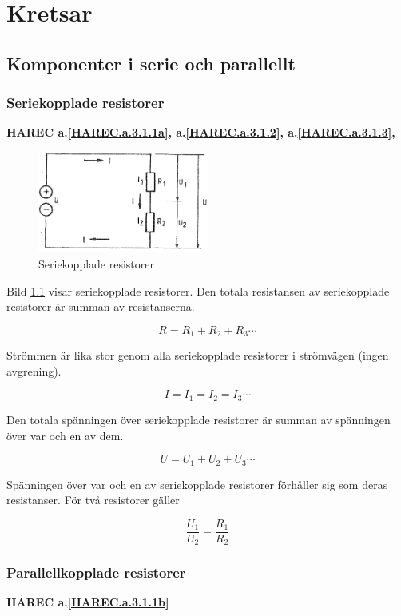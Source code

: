 \chapter{Kretsar}

\section[Serie och parallellt]{Komponenter i serie och parallellt}

\subsection{Seriekopplade resistorer}
\textbf{HAREC
  a.\ref{HAREC.a.3.1.1a}\label{myHAREC.a.3.1.1a},
  a.\ref{HAREC.a.3.1.2}\label{myHAREC.a.3.1.2a},
  a.\ref{HAREC.a.3.1.3}\label{myHAREC.a.3.1.3a},
}

\begin{figure}
\includegraphics[width=0.5\textwidth]{images/cropped_pdfs/bild_2_3-01.pdf}
\caption{Seriekopplade resistorer}
\label{fig:BildII3-01}
\end{figure}

Bild \ref{fig:BildII3-01} visar seriekopplade resistorer.
Den totala resistansen av seriekopplade resistorer är summan av resistanserna.

\[R = R_1 + R_2 + R_3 \cdots \]

Strömmen är lika stor genom alla seriekopplade resistorer i strömvägen (ingen
avgrening).

\[I = I_1 = I_2 = I_3 \cdots \]

Den totala spänningen över seriekopplade resistorer är summan av spänningen över
var och en av dem.

\[U = U_1 + U_2 + U_3 \cdots \]

Spänningen över var och en av seriekopplade resistorer förhåller sig som deras
resistanser. För två resistorer gäller

\[\dfrac{U_1}{U_2} = \dfrac{R_1}{R_2}\]


\subsection{Parallellkopplade resistorer}
\textbf{HAREC a.\ref{HAREC.a.3.1.1b}\label{myHAREC.a.3.1.1b}}

